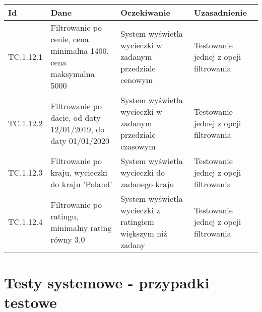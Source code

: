 \documentclass[a4paper,15pt]{article}
\begin{document}
\begin{framed}
\begin{center}
\begin{tabular}{ |C{1.5cm}|C{3cm}|C{4cm}|C{4cm}| } 
 \hline
 \textbf{Id} & \textbf{Dane} & \textbf{Oczekiwanie} & \textbf{Uzasadnienie} \\ \hline
 TC.1.12.1 & Filtrowanie po cenie, cena minimalna 1400, cena maksymalna 5000 & System wyświetla wycieczki w zadanym przedziale cenowym & Testowanie jednej z opcji filtrowania \\ \hline
 TC.1.12.2 & Filtrowanie po dacie, od daty 12/01/2019, do daty 01/01/2020 & System wyświetla wycieczki w zadanym przedziale czasowym & Testowanie jednej z opcji filtrowania \\ \hline
 TC.1.12.3 & Filtrowanie po kraju, wycieczki do kraju 'Poland' & System wyświetla wycieczki do zadanego kraju & Testowanie jednej z opcji filtrowania \\ \hline
 TC.1.12.4 & Filtrowanie po ratingu, minimalny rating równy 3.0 & System wyświetla wycieczki z ratingiem większym niż zadany & Testowanie jednej z opcji filtrowania \\ \hline
\end{tabular}
\end{center}

\end{framed}


\newpage
\section{Testy systemowe - przypadki testowe}
\end{document}
